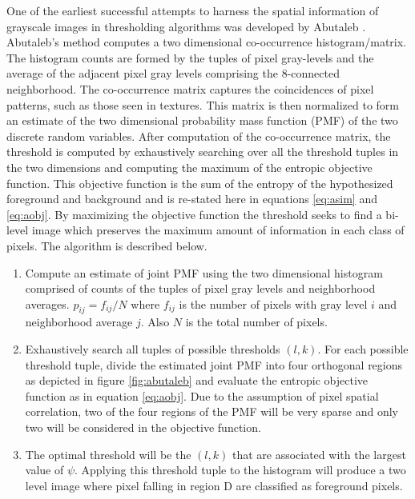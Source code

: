 \documentclass[journal]{IEEEtran}
\begin{document}
\par One of the earliest successful attempts to harness the spatial information of grayscale images in thresholding algorithms was developed by Abutaleb \cite{abutaleb}. Abutaleb's method computes a two dimensional co-occurrence histogram/matrix. The histogram counts are formed by the tuples of pixel gray-levels and the average of the adjacent pixel gray levels comprising the 8-connected neighborhood. The co-occurrence matrix captures the coincidences of pixel patterns, such as those seen in textures. This matrix is then normalized to form an estimate of the two dimensional probability mass function (PMF) of the two discrete random variables. After computation of the co-occurrence matrix, the threshold is computed by exhaustively searching over all the threshold tuples in the two dimensions and computing the maximum of the entropic objective function. This objective function is the sum of the entropy of the hypothesized foreground and background and is re-stated here in equations \ref{eq:asim} and \ref{eq:aobj}. By maximizing the objective function the threshold seeks to find a bi-level image which preserves the maximum amount of information in each class of pixels. The algorithm is described below.
\begin{enumerate}
\item Compute an estimate of joint PMF using the two dimensional histogram comprised of counts of the tuples of pixel gray levels and neighborhood averages. \begin{math}p_{ij} = f_{ij}/N\end{math} where \begin{math}f_{ij}\end{math} is the number of pixels with gray level \begin{math}i\end{math} and neighborhood average \begin{math}j\end{math}. Also \begin{math}N\end{math} is the total number of pixels.
\item Exhaustively search all tuples of possible thresholds \begin{math}(l,k)\end{math}. For each possible threshold tuple, divide the estimated joint PMF into four orthogonal regions as depicted in figure \ref{fig:abutaleb} and evaluate the entropic objective function as in equation \ref{eq:aobj}. Due to the assumption of pixel spatial correlation, two of the four regions of the PMF will be very sparse and only two will be considered in the objective function.
\item The optimal threshold will be the \begin{math}(l,k)\end{math} that are associated with the largest value of \begin{math}\psi \end{math}. Applying this threshold tuple to the histogram will produce a two level image where pixel falling in region D are classified as foreground pixels.
\end{enumerate}
\end{document}
